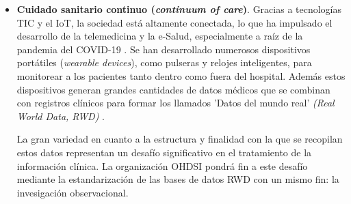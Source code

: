 
\begin{itemize}

\item \textbf{Cuidado sanitario continuo (\textit{continuum of care})}. Gracias a tecnologías TIC y el IoT, la sociedad está altamente conectada, lo que ha impulsado el desarrollo de la telemedicina y la e-Salud, especialmente a raíz de la pandemia del COVID-19 \cite{martin2021ehealth}. Se han desarrollado numerosos dispositivos portátiles (\textit{wearable devices}), como pulseras y relojes inteligentes, para monitorear a los pacientes tanto dentro como fuera del hospital. Además estos dispositivos generan grandes cantidades de datos médicos que se combinan con registros clínicos para formar los llamados 'Datos del mundo real' \textit{(Real World Data, RWD)} \cite{kouroubali2019new}. 

La gran variedad en cuanto a la estructura y finalidad con la que se recopilan estos datos representan un desafío significativo en el tratamiento de la información clínica. La organización OHDSI pondrá fin a este desafío mediante la estandarización de las bases de datos RWD con un mismo fin: la invesigación observacional.



\end{itemize}

